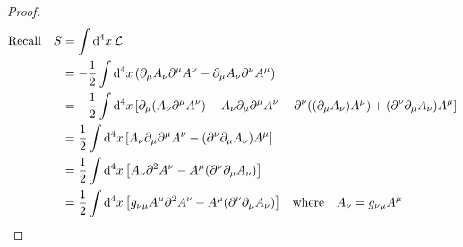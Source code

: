 \documentclass[letterpaper]{article}
\theoremstyle{definition}
\begin{document}
\begin{proof}
  \begin{align*}
    \qq*{Recall} S & =\int\dd[4]{x}\mathcal {L}                                                                                                                                                                            \\
                   & =-\frac{1}{2}\int\dd[4]{x}\pqty{\partial_\mu A_\nu \partial^\mu A^\nu -\partial_\mu A_\nu \partial^\nu A^\mu}                                                                                         \\
                   & =-\frac{1}{2}\int\dd[4]{x}\bqty{\partial_\mu (A_\nu \partial^\mu A^\nu) - A_\nu \partial_\mu\partial^\mu A^\nu -\partial^\nu ((\partial_\mu A_\nu)  A^\mu) + (\partial^\nu\partial_\mu A_\nu ) A^\mu} \\
                   & =\frac{1}{2}\int\dd[4]{x}\bqty{A_\nu \partial_\mu\partial^\mu A^\nu - (\partial^\nu\partial_\mu A_\nu ) A^\mu }                                                                                       \\
                   & =\frac{1}{2}\int\dd[4]{x}\bqty{A_\nu \partial^2 A^\nu -  A^\mu (\partial^\nu\partial_\mu A_\nu )}                                                                                                     \\
                   & =\frac{1}{2}\int\dd[4]{x}\bqty{g_{\nu\mu}A^\mu \partial^2 A^\nu -  A^\mu (\partial^\nu\partial_\mu A_\nu )}\qq{where}A_\nu=g_{\nu\mu}A^\mu                                                            \\
  \end{align*}

\end{proof}
\end{document}
